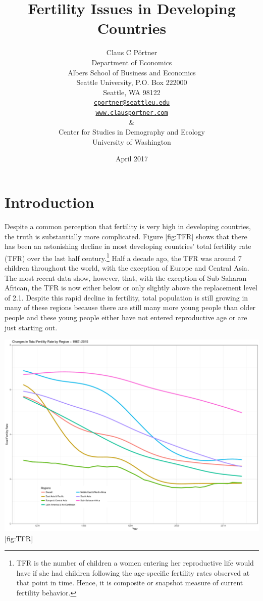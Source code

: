 \documentclass[]{article}
\title{Fertility Issues in Developing Countries}
\author{Claus C Pörtner\\
Department of Economics\\
Albers School of Business and Economics\\
Seattle University, P.O. Box 222000\\
Seattle, WA 98122\\
\href{mailto:cportner@seattleu.edu}{\texttt{cportner@seattleu.edu}}\\
\href{http://www.clausportner.com}{\texttt{www.clausportner.com}}\\
\&\\
Center for Studies in Demography and Ecology\\
University of Washington\\}
\date{April 2017}
\begin{document}
\maketitle

\section{Introduction}\label{introduction}

Despite a common perception that fertility is very high in developing countries, the truth is substantially more complicated. Figure {[}fig:TFR{]} shows that there has been an astonishing decline in most developing countries' total fertility rate (TFR) over the last half century.\footnote{TFR is the number of children a women entering her reproductive life would have if she had children following the age-specific fertility rates observed at that point in time. Hence, it is composite or snapshot measure of current fertility behavior.} Half a decade ago, the TFR was around 7 children throughout the world, with the exception of Europe and Central Asia. The most recent data show, however, that, with the exception of Sub-Saharan African, the TFR is now either below or only slightly above the replacement level of 2.1. Despite this rapid decline in fertility, total population is still growing in many of these regions because there are still many more young people than older people and these young people either have not entered reproductive age or are just starting out.

\includegraphics{../figures/totalFertilityRates.pdf} {[}fig:TFR{]}
\end{document}
